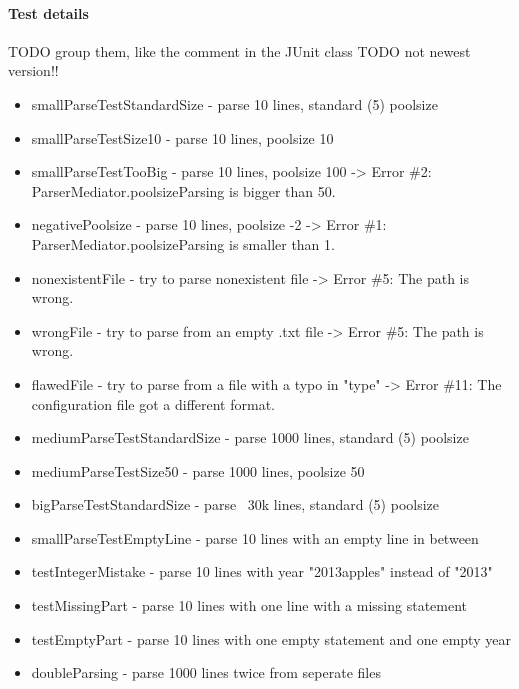 \paragraph{Test details}
TODO group them, like the comment in the JUnit class
TODO not newest version!!
\begin{itemize}

\item smallParseTestStandardSize - parse 10 lines, standard (5) poolsize
\item smallParseTestSize10 - parse 10 lines, poolsize 10
\item smallParseTestTooBig - parse 10 lines, poolsize 100 -> Error \#2: ParserMediator.poolsizeParsing is bigger than 50.
\item negativePoolsize - parse 10 lines, poolsize -2 -> Error \#1: ParserMediator.poolsizeParsing is smaller than 1.
\item nonexistentFile - try to parse nonexistent file -> Error \#5: The path is wrong.
\item wrongFile - try to parse from an empty .txt file -> Error \#5: The path is wrong.
\item flawedFile - try to parse from a file with a typo in "type" -> Error \#11: The configuration file got a different format.
\item mediumParseTestStandardSize - parse 1000 lines, standard (5) poolsize
\item mediumParseTestSize50 - parse 1000 lines, poolsize 50
\item bigParseTestStandardSize - parse ~30k lines, standard (5) poolsize
\item smallParseTestEmptyLine - parse 10 lines with an empty line in between
\item testIntegerMistake - parse 10 lines with year "2013apples" instead of "2013"
\item testMissingPart - parse 10 lines with one line with a missing statement
\item testEmptyPart - parse 10 lines with one empty statement and one empty year
\item doubleParsing - parse 1000 lines twice from seperate files

\end{itemize}
